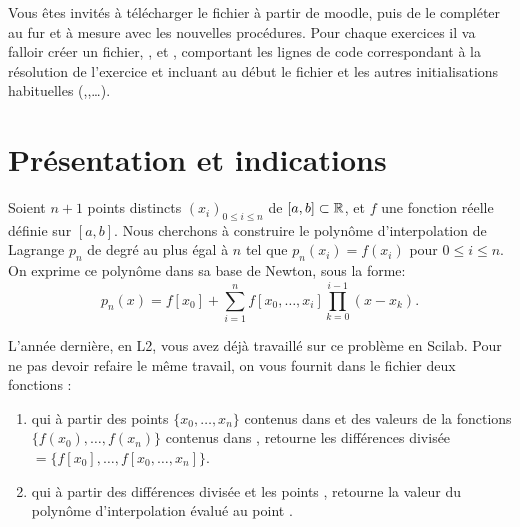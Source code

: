 \documentclass[a4paper,12pt,reqno]{amsart}
\begin{document}

Vous êtes invités à télécharger le fichier  à partir de moodle, puis de le compléter au fur et à mesure avec les nouvelles procédures. Pour chaque exercices il va falloir créer un fichier, ,  et , comportant les lignes de code correspondant à la résolution de l'exercice et incluant au début le fichier  et les autres initialisations habituelles (,,\ldots).



\section{Présentation et indications}

Soient $n+1$ points distincts $(x_i)_{0 \leq i \leq n}$ de $[a,b] \subset \mathbb{R}$, et $f$ une fonction réelle définie sur $[a,b]$. Nous cherchons à construire le polynôme d'interpolation de Lagrange $p_n$ de degré au plus égal à $n$ tel que $p_n(x_i)=f(x_i)$ pour $ 0 \leq i \leq n$. On exprime ce polynôme dans sa base de Newton, sous la forme:
    $$
        p_n(x)= f[x_0]+ \sum_{i=1}^n f[x_0,\ldots,x_i] \prod_{k=0}^{i-1} (x-x_k).
    $$

L'année dernière, en L2, vous avez déjà travaillé sur ce problème en Scilab. Pour ne pas devoir refaire le même travail, on vous fournit dans le fichier  deux fonctions :
\begin{enumerate}
     \item {} qui à partir des points $\{x_0,\ldots,x_n\}$ contenus dans  et des valeurs de la fonctions $\{f(x_0),\ldots,f(x_n)\}$ contenus dans , retourne les différences divisée $=\{f[x_0],\ldots,f[x_0,\ldots,x_n]\}$.
     \item {} qui à partir des différences divisée  et les points , retourne la valeur du polynôme d'interpolation évalué au point .
 \end{enumerate}


\end{document}
